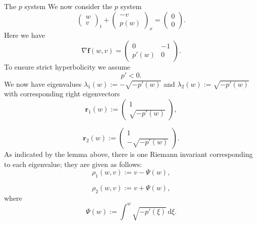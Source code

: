 \begin{Example}{The $p$ system}
\label{ex:p-system-riemann-invariants}
We now consider the $p$ system
\begin{equation}\label{eq:p-system-vector-form}
\begin{pmatrix}w\\v\end{pmatrix}_t+\begin{pmatrix}-v\\p(w)\end{pmatrix}_x=\begin{pmatrix}0\\0\end{pmatrix}.
\end{equation}
Here we have
\begin{equation}\label{eq:p-system-flux-jacobian}
\nabla\bm{f}(w,v)=\begin{pmatrix}0&-1\\p'(w)&0\end{pmatrix}.
\end{equation}
To ensure strict hyperbolicity we assume
\begin{equation}\label{eq:p-system-strict-hyperbolicity}
p'<0.
\end{equation}
We now have eigenvalues $\lambda_1(w):=-\sqrt{-p'(w)}$ and $\lambda_2(w):=\sqrt{-p'(w)}$ with corresponding right eigenvectors
\begin{equation}\label{eq:p-system-first-eigenvector}
\bm{r}_1(w):=\begin{pmatrix}1\\\sqrt{-p'(w)}\end{pmatrix},
\end{equation}

\begin{equation}\label{eq:p-system-second-eigenvector}
\bm{r}_2(w):=\begin{pmatrix}1\\-\sqrt{-p'(w)}\end{pmatrix}.
\end{equation}
As indicated by the lemma above, there is one Riemann invariant corresponding to each eigenvalue; they are given as follows:
\begin{equation}\label{eq:p-system-first-riemann-invariant}
\rho_1(w,v):=v-\Psi(w),
\end{equation}

\begin{equation}\label{eq:p-system-second-riemann-invariant}
\rho_2(w,v):=v+\Psi(w),
\end{equation}
where
\begin{equation}\label{eq:p-system-riemann-primitive}
\Psi(w):=\int^w\sqrt{-p'(\xi)}\,\mathrm{d}\xi.
\end{equation}

\end{Example}

